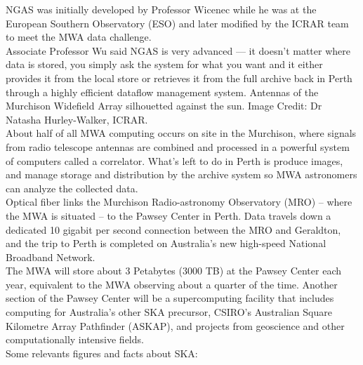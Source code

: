 NGAS was initially developed by Professor Wicenec while he was at the European Southern Observatory (ESO) and later modified by the ICRAR team to meet the MWA data challenge.\\

Associate Professor Wu said NGAS is very advanced — it doesn’t matter where data is stored, you simply ask the system for what you want and it either provides it from the local store or retrieves it from the full archive back in Perth through a highly efficient dataflow management system.
Antennas of the Murchison Widefield Array silhouetted against the sun. Image Credit: Dr Natasha Hurley-Walker, ICRAR.\\

About half of all MWA computing occurs on site in the Murchison, where signals from radio telescope antennas are combined and processed in a powerful system of computers called a correlator. What’s left to do in Perth is produce images, and manage storage and distribution by the archive system so MWA astronomers can analyze the collected data.\\

Optical fiber links the Murchison Radio-astronomy Observatory (MRO) – where the MWA is situated – to the Pawsey Center in Perth. Data travels down a dedicated 10 gigabit per second connection between the MRO and Geraldton, and the trip to Perth is completed on Australia’s new high-speed National Broadband Network.\\


The MWA will store about 3 Petabytes (3000 TB) at the Pawsey Center each year, equivalent to the MWA observing about a quarter of the time. Another section of the Pawsey Center will be a supercomputing facility that includes computing for Australia’s other SKA precursor, CSIRO’s Australian Square Kilometre Array Pathfinder (ASKAP), and projects from geoscience and other computationally intensive fields.\\

Some relevants figures and facts about SKA:

